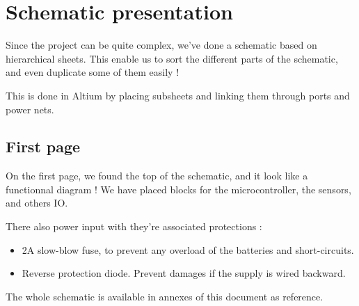 \section{Schematic presentation}
Since the project can be quite complex, we've done a schematic based on hierarchical sheets.
This enable us to sort the different parts of the schematic, and even duplicate some of them easily !

This is done in Altium by placing subsheets and linking them through ports and power nets.

\subsection{First page}
On the first page, we found the top of the schematic, and it look like a functionnal diagram !
We have placed blocks for the microcontroller, the sensors, and others IO.

There also power input with they're associated protections :

\begin{itemize}[noitemsep]
    \item   2A slow-blow fuse, to prevent any overload of the batteries and short-circuits.
    \item   Reverse protection diode. Prevent damages if the supply is wired backward.
\end{itemize}

The whole schematic is available in annexes of this document as reference.